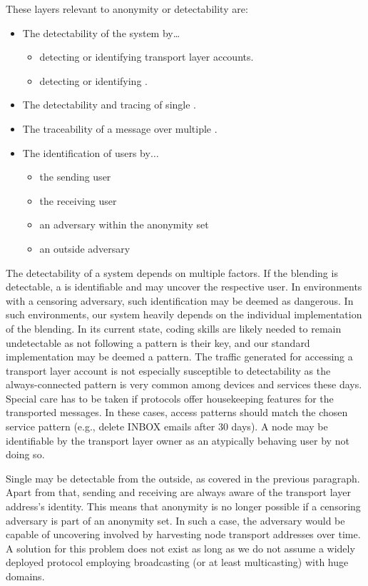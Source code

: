 These layers relevant to anonymity or detectability are:
\begin{itemize}
	\item The detectability of the system by\ldots
	\begin{itemize}
		\item detecting or identifying transport layer accounts.
		\item detecting or identifying \VortexNodes{}.
	\end{itemize}
	\item The detectability and tracing of single \VortexMessages.
	\item The traceability of a message over multiple \VortexNodes{}.
	\item The identification of \MessageVortex{} users by$\ldots$
	\begin{itemize}
		\item the sending \MessageVortex{} user
		\item the receiving \MessageVortex{} user
		\item an adversary within the anonymity set
		\item an outside adversary
	\end{itemize}
\end{itemize} 

The detectability of a system depends on multiple factors. If the blending is detectable, a \VortexNode{} is identifiable and may uncover the respective user. In environments with a censoring adversary, such identification may be deemed as dangerous. In such environments, our system heavily depends on the individual implementation of the blending. In its current state, coding skills are likely needed to remain undetectable as not following a pattern is their key, and our standard implementation may be deemed a pattern. The traffic generated for accessing a transport layer account is not especially susceptible to detectability as the always-connected pattern is very common among devices and services these days. Special care has to be taken if protocols offer housekeeping features for the transported messages. In these cases, access patterns should match the chosen service pattern (e.g., delete INBOX emails after 30 days). A node may be identifiable by the transport layer owner as an atypically behaving user by not doing so.

Single \VortexMessages{} may be detectable from the outside, as covered in the previous paragraph. Apart from that, sending and receiving \VortexNodes{} are always aware of the transport layer address's identity. This means that anonymity is no longer possible if a censoring adversary is part of an anonymity set. In such a case, the adversary would be capable of uncovering involved \VortexNodes{} by harvesting node transport addresses over time. A solution for this problem does not exist as long as we do not assume a widely deployed protocol employing broadcasting (or at least multicasting) with huge domains.

